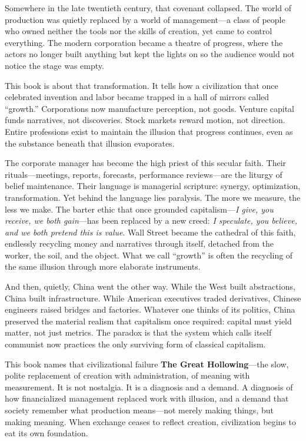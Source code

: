 \documentclass[11pt,twoside]{book}
\begin{document}
Somewhere in the late twentieth century, that covenant collapsed. The world of production was quietly replaced by a world of management---a class of people who owned neither the tools nor the skills of creation, yet came to control everything. The modern corporation became a theatre of progress, where the actors no longer built anything but kept the lights on so the audience would not notice the stage was empty.

This book is about that transformation. It tells how a civilization that once celebrated invention and labor became trapped in a hall of mirrors called ``growth.'' Corporations now manufacture perception, not goods. Venture capital funds narratives, not discoveries. Stock markets reward motion, not direction. Entire professions exist to maintain the illusion that progress continues, even as the substance beneath that illusion evaporates.

The corporate manager has become the high priest of this secular faith. Their rituals---meetings, reports, forecasts, performance reviews---are the liturgy of belief maintenance. Their language is managerial scripture: synergy, optimization, transformation. Yet behind the language lies paralysis. The more we measure, the less we make.
\clearpage
The barter ethic that once grounded capitalism---\emph{I give, you receive, we both gain}---has been replaced by a new creed: \emph{I speculate, you believe, and we both pretend this is value}. Wall Street became the cathedral of this faith, endlessly recycling money and narratives through itself, detached from the worker, the soil, and the object. What we call ``growth'' is often the recycling of the same illusion through more elaborate instruments.

And then, quietly, China went the other way. While the West built abstractions, China built infrastructure. While American executives traded derivatives, Chinese engineers raised bridges and factories. Whatever one thinks of its politics, China preserved the material realism that capitalism once required: capital must yield matter, not just metrics. The paradox is that the system which calls itself communist now practices the only surviving form of classical capitalism.

This book names that civilizational failure \textbf{The Great Hollowing}---the slow, polite replacement of creation with administration, of meaning with measurement. It is not nostalgia. It is a diagnosis and a demand. A diagnosis of how financialized management replaced work with illusion, and a demand that society remember what production means---not merely making things, but making meaning. When exchange ceases to reflect creation, civilization begins to eat its own foundation.
\end{document}
